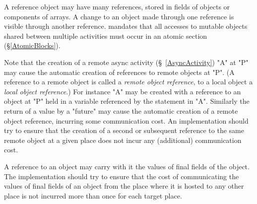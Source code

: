 A reference object may have many references, stored in fields of
objects or components of arrays. A change to an object made through
one reference is visible through another reference. \Xten{} mandates
that all accesses to mutable objects shared between multiple
activities must occur in an atomic section (\S\ref{AtomicBlocks}).

\cbstart 
Note that the creation of a remote async activity
(\S~\ref{AsyncActivity}) \xcd"A" at \xcd"P" may cause the automatic creation of
references to remote objects at \xcd"P". (A reference to a remote
object is called a {\em remote object reference}, to a local object a
{\em local object reference}.)  For instance \xcd"A" may be created
with a reference to an object at \xcd"P" held in a variable referenced
by the statement in \xcd"A".  Similarly the return of a value by a
\xcd"future" may cause the automatic creation of a remote object
reference, incurring some communication cost.  An {}\Xten{}
implementation should try to ensure that the creation of a second or
subsequent reference to the same remote object at a given place does
not incur any (additional) communication cost.

\cbend 

A reference to an object may carry with it the values of final fields
of the object. The implementation should try to ensure that the cost
of communicating the values of final fields of an object from the
place where it is hosted to any other place is not incurred more than
once for each target place.

